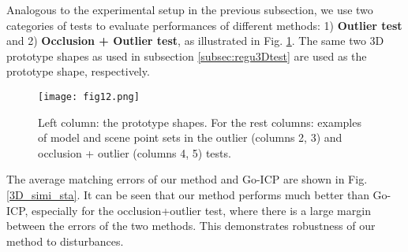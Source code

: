 \documentclass[11pt,bezier,]{article}
\begin{document}
Analogous  to the experimental setup in the previous   subsection,
we use two categories  of tests to evaluate  performances of different methods:
1) \textbf{Outlier test} and
2) \textbf{Occlusion + Outlier test},
as illustrated in  Fig. \ref{rot_3D_test_data_exa}.
The same two 3D prototype shapes as used in subsection \ref{subsec:regu3Dtest}
are used as the prototype shape, respectively.


\begin{figure}[ht]
\centering

\texttt{[image: fig12.png]}


% 
\caption{
Left column: the prototype shapes.
For the rest columns:
examples of model and scene point sets in the %
outlier (columns 2, 3) and occlusion + outlier (columns 4, 5) tests. 
\label{rot_3D_test_data_exa}}
\end{figure}

The average matching errors of our method and  Go-ICP are shown in Fig. \ref{3D_simi_sta}.
It can be seen that
our method performs much  better than Go-ICP,
especially for the occlusion+outlier test,
where there is a large margin between the errors of the two methods.
This demonstrates  robustness of our method to disturbances.

\end{document}
